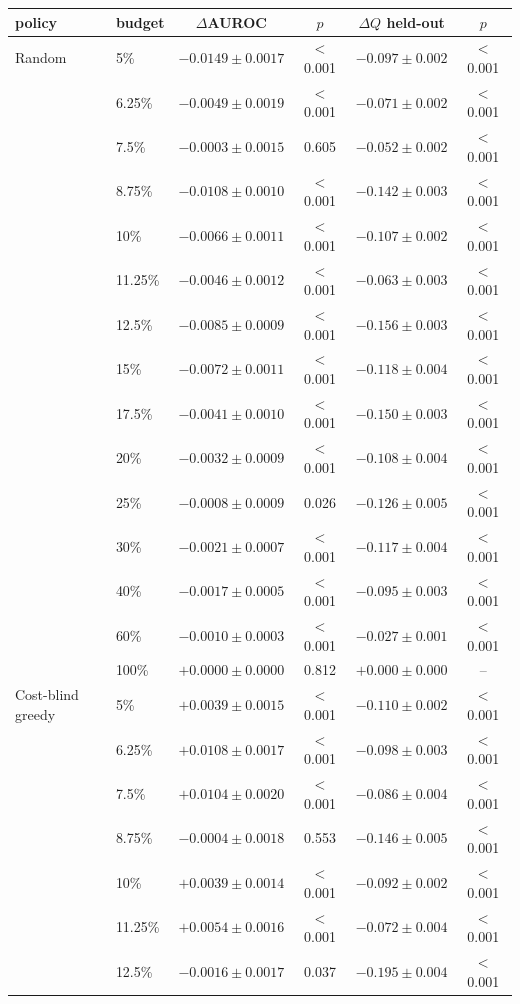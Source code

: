 \begin{tabular}{llcccc}
\toprule
policy & budget & $\Delta$AUROC & $p$ & $\Delta Q$ held-out & $p$ \\
\midrule
Random & 5\% & $-0.0149\pm0.0017$ & $<$0.001 & $-0.097\pm0.002$ & $<$0.001 \\
 & 6.25\% & $-0.0049\pm0.0019$ & $<$0.001 & $-0.071\pm0.002$ & $<$0.001 \\
 & 7.5\% & $-0.0003\pm0.0015$ & 0.605 & $-0.052\pm0.002$ & $<$0.001 \\
 & 8.75\% & $-0.0108\pm0.0010$ & $<$0.001 & $-0.142\pm0.003$ & $<$0.001 \\
 & 10\% & $-0.0066\pm0.0011$ & $<$0.001 & $-0.107\pm0.002$ & $<$0.001 \\
 & 11.25\% & $-0.0046\pm0.0012$ & $<$0.001 & $-0.063\pm0.003$ & $<$0.001 \\
 & 12.5\% & $-0.0085\pm0.0009$ & $<$0.001 & $-0.156\pm0.003$ & $<$0.001 \\
 & 15\% & $-0.0072\pm0.0011$ & $<$0.001 & $-0.118\pm0.004$ & $<$0.001 \\
 & 17.5\% & $-0.0041\pm0.0010$ & $<$0.001 & $-0.150\pm0.003$ & $<$0.001 \\
 & 20\% & $-0.0032\pm0.0009$ & $<$0.001 & $-0.108\pm0.004$ & $<$0.001 \\
 & 25\% & $-0.0008\pm0.0009$ & 0.026 & $-0.126\pm0.005$ & $<$0.001 \\
 & 30\% & $-0.0021\pm0.0007$ & $<$0.001 & $-0.117\pm0.004$ & $<$0.001 \\
 & 40\% & $-0.0017\pm0.0005$ & $<$0.001 & $-0.095\pm0.003$ & $<$0.001 \\
 & 60\% & $-0.0010\pm0.0003$ & $<$0.001 & $-0.027\pm0.001$ & $<$0.001 \\
 & 100\% & $+0.0000\pm0.0000$ & 0.812 & $+0.000\pm0.000$ & -- \\
\midrule
Cost-blind greedy & 5\% & $+0.0039\pm0.0015$ & $<$0.001 & $-0.110\pm0.002$ & $<$0.001 \\
 & 6.25\% & $+0.0108\pm0.0017$ & $<$0.001 & $-0.098\pm0.003$ & $<$0.001 \\
 & 7.5\% & $+0.0104\pm0.0020$ & $<$0.001 & $-0.086\pm0.004$ & $<$0.001 \\
 & 8.75\% & $-0.0004\pm0.0018$ & 0.553 & $-0.146\pm0.005$ & $<$0.001 \\
 & 10\% & $+0.0039\pm0.0014$ & $<$0.001 & $-0.092\pm0.002$ & $<$0.001 \\
 & 11.25\% & $+0.0054\pm0.0016$ & $<$0.001 & $-0.072\pm0.004$ & $<$0.001 \\
 & 12.5\% & $-0.0016\pm0.0017$ & 0.037 & $-0.195\pm0.004$ & $<$0.001 \\

\end{tabular}
